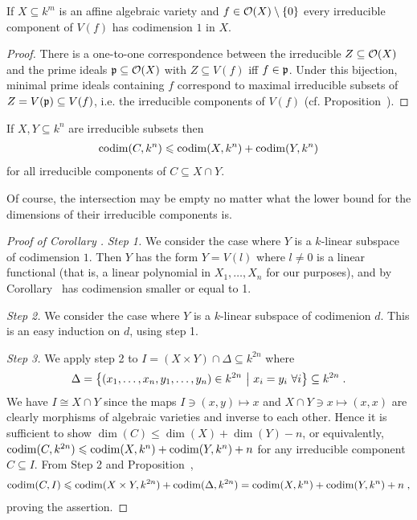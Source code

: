 \documentclass[a4paper,parskip=half,numbers=enddot, DIV=12]{scrreprt}
\renewcommand{\leq}{\leqslant}
\begin{document}
	\begin{cor}[or Corollary 1?]
		If $X\subseteq k^m$ is an affine algebraic variety and $f\in \mathcal{O}(X)\setminus\{0\}$ every irreducible component of $V(f)$ has codimension $1$ in $X$. 
	\end{cor}
	\begin{proof}
		There is a one-to-one correspondence between the irreducible $Z\subseteq \mathcal{O}(X)$ and the prime ideals $\mathfrak{p}\subseteq \mathcal{O}(X)$ with $Z\subseteq V(f)$ iff $f\in\mathfrak{p}$. Under this bijection, minimal prime ideals containing $f$ correspond to maximal irreducible subsets of $Z=V(\mathfrak{p})\subseteq V(f)$, i.e. the irreducible components of $V(f)$ (cf. Proposition~).
	\end{proof}
	\begin{cor}
		If $X,Y\subseteq k^n$ are irreducible subsets then
		\begin{align*}
			\codim(C,k^n)\leq\codim(X,k^n)+\codim(Y,k^n)
		\end{align*}
		 for all irreducible components of $C\subseteq X\cap Y$.
	\end{cor}
	\begin{rem}
		Of course, the intersection may be empty no matter what the lower bound for the dimensions of their irreducible components is.
	\end{rem}
	\begin{proof}[Proof of Corollary ]
		\emph{Step 1.}	We consider the case where $Y$ is a $k$-linear subspace of codimension $1$. Then $Y$ has the form $Y = V(l)$ where $l\neq 0$ is a linear functional (that is, a linear polynomial in $X_1,\ldots,X_n$ for our purposes), and by Corollary~ has codimension smaller or equal to 1.
		
		\emph{Step 2.}	We consider the case where $Y$ is a $k$-linear subspace of codimenion $d$. This is an easy induction on $d$, using step 1.
		
		\emph{Step 3.}	We apply step 2 to $I = (X\times Y)\cap \Delta\subseteq k^{2n}$ where 
		\begin{align*}
			\Delta =\left\{(x_1,\ldots,x_n,y_1,\ldots,y_n)\in k^{2n}\ \middle|\  x_i= y_i\ \forall i\right\} \subseteq k^{2n}\;.
		\end{align*}
		We have $I\cong X\cap Y$ since the maps $I\ni(x,y) \mapsto x$ and $X\cap Y\ni x\mapsto (x,x)$ are clearly morphisms of algebraic varieties and inverse to each other. Hence it is sufficient to show $\dim (C) \leq \dim (X)+\dim (Y) - n$, or equivalently, $\codim(C,k^{2n}) \leq \codim(X,k^n)+\codim(Y,k^n) +n$ for any irreducible component $C\subseteq I$. From Step 2 and Proposition~,
		\begin{align*}
			\codim(C,I)\leq\codim(X\times Y,k^{2n})+\codim(\Delta,k^{2n})=\codim(X,k^n)+\codim(Y,k^n)+n\;,
		\end{align*}
		proving the assertion.
	\end{proof}
\end{document}
